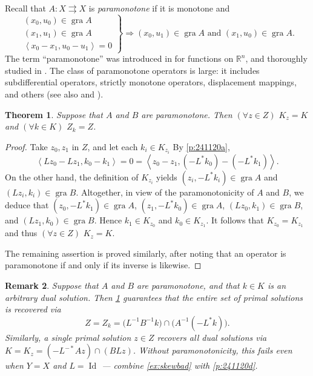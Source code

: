 \documentclass{article}
\newcommand{\To}{\ensuremath{\rightrightarrows}}
\newcommand{\scal}[2]{\left\langle{#1},{#2}  \right\rangle}
\newcommand{\RR}{\ensuremath{\mathbb R}}
\newcommand{\Id}{\ensuremath{\operatorname{Id}}}
\newtheorem{theorem}{Theorem}[section]
\newtheorem{remark}[theorem]{Remark}
\providecommand{\gr}{\operatorname{gra}}
\begin{document}
\label{s:para}


Recall that $A:X\To X$ is \emph{paramonotone} if it is monotone and 
\begin{equation*}
\left. 
\begin{array}{c}
(x_0,u_0)\in\gr A\\
(x_1,u_1)\in\gr A\\
\scal{x_0-x_1}{u_0-u_1}=0
\end{array}
\right\}
\Rightarrow 
(x_0,u_1)\in\gr A \text{ and }(x_1,u_0)\in\gr A.
\end{equation*}
The term ``paramonotone'' was introduced in 
\cite{Paramonotone} for functions on $\RR^n$, 
and thoroughly studied in \cite{IusPara}. 
The class of paramonotone operators is large: it includes subdifferential 
operators, strictly monotone operators, displacement mappings, and others 
(see also \cite{BC2017} and \cite{BWY2014}). 




\begin{theorem}\label{thm:paraZK}
Suppose that 
$A$ and $B$ are paramonotone. 
Then $(\forall z\in Z)$ $K_z=K$ and $(\forall k\in K)$ $Z_k=Z$.
\end{theorem}
\begin{proof}
Take $z_0,z_1$ in $Z$, and let each $k_i \in K_{z_i}$ 
By \cref{p:241120a}, 
\begin{equation}
\scal{Lz_0-Lz_1}{k_0-k_1} = 0 = \scal{z_0-z_1}{(-L^*k_0)-(-L^*k_1)}.
\end{equation}
On the other hand, the definition of $K_{z_i}$ yields
$(z_i,-L^*k_i)\in\gr A$ and $(Lz_i,k_i)\in\gr B$. 
Altogether, in view of the paramonotonicity of $A$ and $B$, 
we deduce that 
$(z_0,-L^*k_1)\in\gr A$, 
$(z_1,-L^*k_0)\in\gr A$, 
$(Lz_0,k_1)\in\gr B$, and 
$(Lz_1,k_0)\in\gr B$. 
Hence $k_1\in K_{z_0}$ and $k_0\in K_{z_1}$.
It follows that $K_{z_0}=K_{z_1}$ and thus $(\forall z\in Z)$ $K_z=K$.

The remaining assertion is proved similarly, after noting that an operator
is paramonotone if and only if its inverse is likewise. 
\end{proof}



\begin{remark}
\label{r:pararecovery}
Suppose that $A$ and $B$ are paramonotone, and that 
$k\in K$ is an \emph{arbitrary} dual solution. 
Then 
\cref{thm:paraZK} guarantees that the \emph{entire set of primal solutions}
is recovered via
\begin{equation}
Z = Z_k = \big(L^{-1}B^{-1}k\big) \cap \big(A^{-1}(-L^*k)\big).
\end{equation}
Similarly, a single primal solution $z\in Z$ recovers all 
dual solutions via $K = K_z = (-L^{-*}Az)\cap (BLz)$. 
Without paramonotonicity, this fails even when $Y=X$ and $L=\Id$ --- 
combine \cref{ex:skewbad} with \cref{p:241120d}. 
\end{remark}
\end{document}
